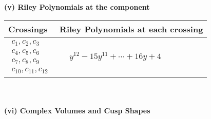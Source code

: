 \documentclass[1p]{elsarticle_modified}
\theoremstyle{definition}
\begin{document}
\newpage\renewcommand{\arraystretch}{1}
\flushleft \textbf{(v) Riley Polynomials at the component}\newline \\
\begin{tabular}{m{50pt}|m{274pt}}
Crossings & \hspace{64pt}Riley Polynomials at each crossing \\
\hline $$\begin{aligned}c_{1},c_{2},c_{3}\\c_{4},c_{5},c_{6}\\c_{7},c_{8},c_{9}\\c_{10},c_{11},c_{12}\end{aligned}$$&$\begin{aligned}
&y^{12}-15 y^{11}+\cdots+16 y+4
\end{aligned}$\\
\hline
\end{tabular}\\~\\
\newpage\flushleft \textbf{(vi) Complex Volumes and Cusp Shapes}
\end{document}
